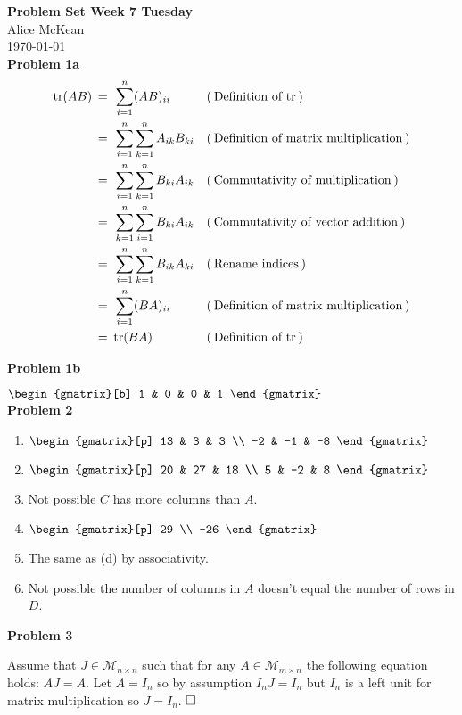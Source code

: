 \documentclass{article}
\newcommand{\problem}[1]{\large\textbf{Problem #1}\normalsize}
\newcommand{\evidence}[1]{\ensuremath{(\hspace{0.2em} \text{#1} \hspace{0.2em})}}
\newcommand{\relation}[1]{\ensuremath{\hspace{0.2em} {{} #1 {}} \hspace{0.2em}}}
\newcommand{\equal}{\relation{=}}
\newcommand{\qed}{\hfill\ensuremath{\square}}
\begin{document}
\noindent\Large\textbf{Problem Set Week 7 Tuesday} \\
\normalsize
Alice McKean \\
\today \\

\problem{1a}
\begin{align*}
  \displaystyle
  \text{tr}(AB)
     & \equal \sum_{i=1}^{n} (AB)_{ii}                  && \evidence{Definition of tr} \\
  {} & \equal \sum_{i=1}^{n} \sum_{k=1}^{n} A_{ik}B_{ki} && \evidence{Definition of matrix multiplication} \\
  {} & \equal \sum_{i=1}^{n} \sum_{k=1}^{n} B_{ki}A_{ik} && \evidence{Commutativity of multiplication} \\
  {} & \equal \sum_{k=1}^{n} \sum_{i=1}^{n} B_{ki}A_{ik} && \evidence{Commutativity of vector addition} \\
  {} & \equal \sum_{i=1}^{n} \sum_{k=1}^{n} B_{ik}A_{ki} && \evidence{Rename indices} \\
  {} & \equal \sum_{i=1}^{n} (BA)_{ii}                  && \evidence{Definition of matrix multiplication} \\
  {} & \equal \text{tr}(BA)                           && \evidence{Definition of tr} \\
\end{align*}

\problem{1b}

$
\begin{gmatrix}[b]
  1 & 0 & 0 & 1
\end{gmatrix} 
$ \\

\problem{2}

\begin{enumerate}[label=(\alph*)]
\item
  $
  \begin{gmatrix}[p]
    13 & 3  & 3 \\
    -2 & -1 & -8
  \end{gmatrix} 
  $
\item
  $
  \begin{gmatrix}[p]
    20 & 27 & 18 \\
    5 & -2  & 8
  \end{gmatrix} 
  $
\item Not possible $C$ has more columns than $A$.
\item
  $
  \begin{gmatrix}[p]
    29 \\
    -26
  \end{gmatrix} 
  $
\item The same as (d) by associativity.
\item Not possible the number of columns in $A$ doesn't equal the number of rows
  in $D$.
\end{enumerate}

\problem{3}


Assume that $J \in \mathcal{M}_{n \times n}$ such that for any $A \in
\mathcal{M}_{m \times n}$ the following equation holds: $AJ = A$. Let $A = I_n$
so by assumption $I_nJ = I_n$ but $I_n$ is a left unit for matrix
multiplication so
$J = I_n$. $\qed$
\end{document}

